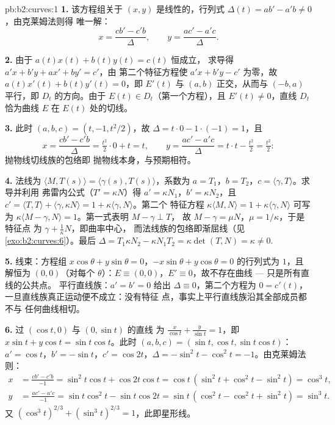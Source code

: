 \begin{solution}{pb:b2:curves:1}
\textbf{1.} 该方程组关于 $(x, y)$ 是线性的，行列式
$\Delta(t) = a b' - a'b \neq 0$，由克莱姆法则得
唯一解：
\[
x = \frac{c b' - c' b}{\Delta}, \qquad
y = \frac{a c' - a' c}{\Delta}.
\]

\textbf{2.} 由于 $a(t)x(t) + b(t)y(t) = c(t)$ 恒成立，
求导得 $a'x + b'y + ax' + by' = c'$，由
第二个特征方程使 $a'x + b'y - c'$ 为零，故
$a(t)x'(t) + b(t)y'(t) = 0$，即 $E'(t)$ 与 $(a,
b)$ 正交，从而与 $(-b, a)$ 平行，即 $D_t$ 的方向。由于
$E(t) \in D_t$（第一个方程），且 $E'(t) \neq 0$，直线
$D_t$ 恰为曲线 $E$ 在 $E(t)$ 处的切线。

\textbf{3.} 此时 $(a, b, c) = (t, -1, t^2/2)$，故 $\Delta =
t\cdot0 - 1\cdot(-1) = 1$，且
\[
x = \frac{c b' - c' b}{\Delta} = \tfrac{t^2}2\cdot 0 +
t = t, \qquad
y = \frac{a c' - a' c}{\Delta} = t\cdot t - \tfrac{t^2}2 =
\tfrac{t^2}2 :
\]
抛物线切线族的包络即
抛物线本身，与预期相符。

\textbf{4.} 法线为 $\langle M, T(s)\rangle =
\langle\gamma(s), T(s)\rangle$，系数为 $a = T_1$，$b =
T_2$，$c = \langle\gamma, T\rangle$。求导并利用
弗雷内公式（$T' = \kappa N$）得 $a' = \kappa N_1$，$b' = \kappa
N_2$，且 $c' = \langle T, T\rangle + \langle\gamma, \kappa
N\rangle = 1 + \kappa\langle\gamma, N\rangle$。第二个
特征方程 $\kappa\langle M, N\rangle = 1 +
\kappa\langle\gamma, N\rangle$ 可写为 $\kappa\langle M -
\gamma, N\rangle = 1$。第一式表明 $M - \gamma \perp T$，
故 $M - \gamma = \mu N$，$\mu = 1/\kappa$，于是特征点
为 $\gamma + \frac1\kappa N$，即曲率中心，
而法线族的包络即渐屈线（见
\cref{exo:b2:curves:6}）。最后 $\Delta = T_1\kappa N_2 -
\kappa N_1 T_2 = \kappa\det(T, N) = \kappa \neq 0$.

\textbf{5.} 线束：方程组 $x\cos\theta + y\sin\theta =
0$，$-x\sin\theta + y\cos\theta = 0$ 的行列式为 $1$，且
解恒为 $(0,0)$（对每个 $\theta$）：$E \equiv (0,0)$，$E'
\equiv 0$，故不存在曲线 --- 只是所有直线的公共点。
平行直线族：$a' = b' = 0$ 给出
$\Delta \equiv 0$，第二个方程为 $0 = c'(t)$，
一旦直线族真正运动便不成立：没有特征
点，事实上平行直线族沿其全部成员都不与
任何曲线相切。

\textbf{6.} 过 $(\cos t, 0)$ 与 $(0, \sin t)$ 的直线
为 $\frac x{\cos t} + \frac y{\sin t} = 1$，即 $x\sin t +
y\cos t = \sin t\cos t$。此时 $(a, b, c) = (\sin t, \cos t,
\sin t\cos t)$：$a' = \cos t$，$b' = -\sin t$，$c' = \cos
2t$，$\Delta = -\sin^2 t - \cos^2 t = -1$。由克莱姆法则：
\begin{align*}
x &= \frac{cb' - c'b}{-1} = \sin^2 t\cos t + \cos 2t\cos t
= \cos t\,(\sin^2 t + \cos^2 t - \sin^2 t) = \cos^3 t,\\
y &= \frac{ac' - a'c}{-1} = \sin t\cos^2 t - \sin t\cos 2t
= \sin t\,(\cos^2 t - \cos^2 t + \sin^2 t) = \sin^3 t .
\end{align*}
又 $(\cos^3t)^{2/3} + (\sin^3t)^{2/3} = 1$，此即星形线。


\end{solution}
